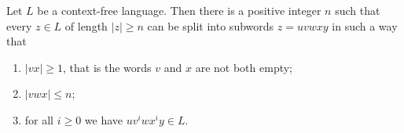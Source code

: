 

\setcounter{section}{7}
\setcounter{subsection}{2}
\setcounter{dfn}{3}

\begin{thm}
\label{thm:PumpCFL}
Let $L$ be a context-free language.
Then there is a positive integer $n$ such that every $z \in L$ of length $|z| \ge n$ can be split into subwords $z = uvwxy$ in such a way that
\begin{enumerate}
\item
$|vx| \ge 1$, that is the words $v$ and $x$ are not both empty;
\item
$|vwx| \le n$;
\item
for all $i \ge 0$ we have $uv^iwx^iy \in L$.
\end{enumerate}
\end{thm}

